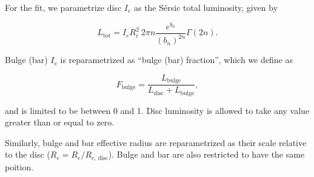 \documentclass[../main.tex]{subfiles}
\begin{document}
For the fit, we parametrize disc $I_e$ as the S\'ersic total luminosity, given by

\begin{equation}
L_\mathrm{tot} = I_eR_e^2\ 2\pi n\frac{e^{b_n}}{(b_n)^{2n}}\Gamma(2n).
\end{equation}

Bulge (bar) $I_e$ is reparametrized as ``bulge (bar) fraction'', which we define as

\begin{equation}
F_\mathrm{bulge} = \frac{L_\mathrm{bulge}}{L_\mathrm{disc} + L_\mathrm{bulge}},
\end{equation}

and is limited to be between 0 and 1. Disc luminosity is allowed to take any value greater than or equal to zero.

Similarly, bulge and bar effective radius are reparametrized as their scale relative to the disc ($R_e = R_e / R_{e,\,\mathrm{disc}}$). Bulge and bar are also restricted to have the same poition.
\end{document}
